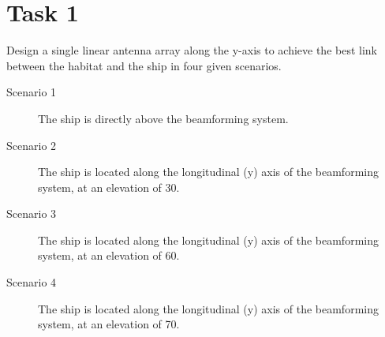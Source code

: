 \documentclass{article}[a4paper]
\begin{document}
\section*{Task 1}

Design a single linear antenna array along the y-axis to achieve the best link between the habitat and the ship in four given scenarios.
\begin{description}
	\item[Scenario 1] The ship is directly above the beamforming system.
	\item[Scenario 2] The ship is located along the longitudinal (y) axis of the beamforming system, at an elevation of 30\textdegree.
	\item[Scenario 3] The ship is located along the longitudinal (y) axis of the beamforming system, at an elevation of 60\textdegree.
	\item[Scenario 4] The ship is located along the longitudinal (y) axis of the beamforming system, at an elevation of 70\textdegree.
\end{description}
\end{document}
